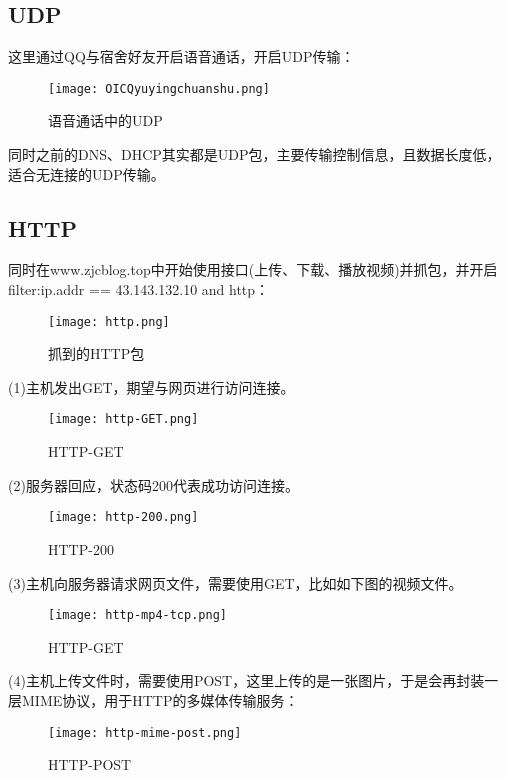 \documentclass{xjtureport}
\begin{document}
\subsection{UDP}
这里通过QQ与宿舍好友开启语音通话，开启UDP传输：
\begin{figure}[H]
	\centering
	\texttt{[image: OICQyuyingchuanshu.png]}
	\caption{语音通话中的UDP}
\end{figure}
同时之前的DNS、DHCP其实都是UDP包，主要传输控制信息，且数据长度低，适合无连接的UDP传输。
\subsection{HTTP}
同时在www.zjcblog.top中开始使用接口(上传、下载、播放视频)并抓包，并开启filter:ip.addr == 43.143.132.10 and http：
\begin{figure}[H]
	\centering
	\texttt{[image: http.png]}
	\caption{抓到的HTTP包}
\end{figure}
(1)主机发出GET，期望与网页进行访问连接。
\begin{figure}[H]
	\centering
	\texttt{[image: http-GET.png]}
	\caption{HTTP-GET}
\end{figure}
(2)服务器回应，状态码200代表成功访问连接。
\begin{figure}[H]
	\centering
	\texttt{[image: http-200.png]}
	\caption{HTTP-200}
\end{figure}
(3)主机向服务器请求网页文件，需要使用GET，比如如下图的视频文件。
\begin{figure}[H]
	\centering
	\texttt{[image: http-mp4-tcp.png]}
	\caption{HTTP-GET}
\end{figure}
(4)主机上传文件时，需要使用POST，这里上传的是一张图片，于是会再封装一层MIME协议，用于HTTP的多媒体传输服务：
\begin{figure}[H]
	\centering
	\texttt{[image: http-mime-post.png]}
	\caption{HTTP-POST}
\end{figure}
\end{document}

